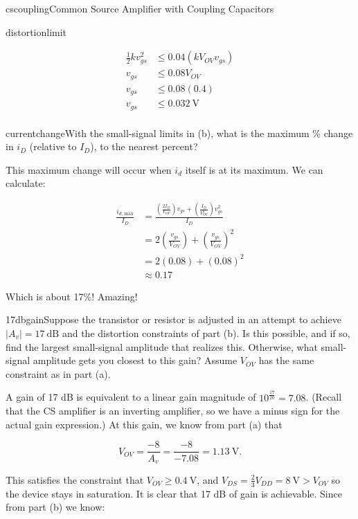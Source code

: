 \begin{mainquestion}{cscoupling}{Common Source Amplifier with Coupling Capacitors}
\begin{partquestion}{distortionlimit}
\begin{answer}
\begin{align*}
    \frac{1}{2}k v_{gs}^2 &\leq 0.04 (k V_{OV} v_{gs}) \\
    v_{gs} &\leq 0.08 V_{OV} \\
    v_{gs} &\leq 0.08 (0.4) \\
    v_{gs} &\leq \qty{0.032}{\volt} \\
\end{align*}
\end{answer}
\end{partquestion}

\begin{partquestion}{currentchange}{With the small-signal limits in (b), what is the maximum \% change in $i_{D}$ (relative to $I_{D}$), to the nearest percent?}
\begin{answer}
This maximum change will occur when $i_{d}$ itself is at its maximum. We can calculate:

\begin{align*}
    \frac{i_{d\text{, max}}}{I_D} &= \frac{\left(\frac{2 I_D}{V_{OV}}\right)v_{gs} + \left(\frac{I_D}{V_{OV}^2}\right)v_{gs}^2}{I_D}\\
    &= 2\left(\frac{v_{gs}}{V_{OV}}\right) + \left(\frac{v_{gs}}{V_{OV}}\right)^2\\
    &= 2(0.08) + (0.08)^2\\
    &\approx 0.17
\end{align*}

Which is about 17\%! Amazing!
\end{answer}
\end{partquestion}

\begin{partquestion}{17dbgain}{Suppose the transistor or resistor is adjusted in an attempt to achieve $\left|A_{v}\right| = 17\ \text{dB}$ and the distortion constraints of part (b). Is this possible, and if so, find the largest small-signal amplitude that realizes this. Otherwise, what small-signal amplitude gets you closest to this gain? Assume $V_{OV}$ has the same constraint as in part (a).}
\begin{answer}
A gain of 17 dB is equivalent to a linear gain magnitude of $10^{\frac{17}{20}} = 7.08$. (Recall that the CS amplifier is an inverting amplifier, so we have a minus sign for the actual gain expression.) At this gain, we know from part (a) that

\[
V_{OV} = \frac{-8}{A_{v}} = \frac{-8}{-7.08} = \qty{1.13}{\volt}.
\]

This satisfies the constraint that $V_{OV} \geq \qty{0.4}{\volt}$, and $V_{DS} = \frac{2}{3}V_{DD} = \qty{8}{\volt} > V_{OV}$ so the device stays in saturation. It is clear that 17 dB of gain is achievable. Since from part (b) we know:


\end{answer}
\end{partquestion}
\end{mainquestion}
